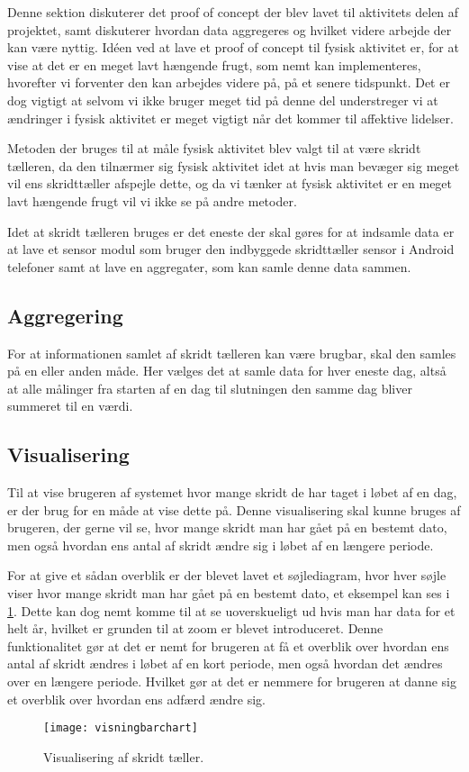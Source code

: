 Denne sektion diskuterer det proof of concept der blev lavet til aktivitets delen af projektet, samt diskuterer hvordan data aggregeres og hvilket videre arbejde der kan være nyttig. 
Idéen ved at lave et proof of concept til fysisk aktivitet er, for at vise at det er en meget lavt hængende frugt, som nemt kan implementeres, hvorefter vi forventer den kan arbejdes videre på, på et senere tidspunkt. 
Det er dog vigtigt at selvom vi ikke bruger meget tid på denne del understreger vi at ændringer i fysisk aktivitet er meget vigtigt når det kommer til affektive lidelser. 

Metoden der bruges til at måle fysisk aktivitet blev valgt til at være skridt tælleren, da den tilnærmer sig fysisk aktivitet idet at hvis man bevæger sig meget vil ens skridttæller afspejle dette, og da vi tænker at fysisk aktivitet er en meget lavt hængende frugt vil vi ikke se på andre metoder.

Idet at skridt tælleren bruges er det eneste der skal gøres for at indsamle data er at lave et sensor modul som bruger den indbyggede skridttæller sensor i Android telefoner samt at lave en aggregater, som kan samle denne data sammen. 

\subsection{Aggregering}
For at informationen samlet af skridt tælleren kan være brugbar, skal den samles på en eller anden måde.
Her vælges det at samle data for hver eneste dag, altså at alle målinger fra starten af en dag til slutningen den samme dag bliver summeret til en værdi.

\subsection{Visualisering}\label{sec:aktivitetVis}
Til at vise brugeren af systemet hvor mange skridt de har taget i løbet af en dag, er der brug for en måde at vise dette på.
Denne visualisering skal kunne bruges af brugeren, der gerne vil se, hvor mange skridt man har gået på en bestemt dato, men også hvordan ens antal af skridt ændre sig i løbet af en længere periode.

For at give et sådan overblik er der blevet lavet et søjlediagram, hvor hver søjle viser hvor mange skridt man har gået på en bestemt dato, et eksempel kan ses i \cref{fig:skridttaeller}.
Dette kan dog nemt komme til at se uoverskueligt ud hvis man har data for et helt år, hvilket er grunden til at zoom er blevet introduceret.
Denne funktionalitet gør at det er nemt for brugeren at få et overblik over hvordan ens antal af skridt ændres i løbet af en kort periode, men også hvordan det ændres over en længere periode.
Hvilket gør at det er nemmere for brugeren at danne sig et overblik over hvordan ens adfærd ændre sig.

\begin{figure}[h]
	\centering
	\texttt{[image: visningbarchart]}
	\caption{Visualisering af skridt tæller.}
	\label{fig:skridttaeller}
\end{figure}